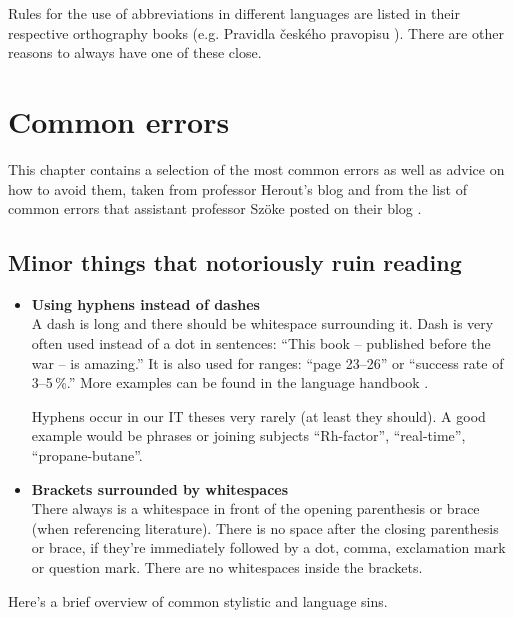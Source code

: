 Rules for the use of abbreviations in different languages are listed in their respective orthography books (e.g. Pravidla českého pravopisu \cite{Pravidla}). There are other reasons to always have one of these close.

\section{Common errors}
\label{chyby}

This chapter contains a selection of the most common errors as well as advice on how to avoid them, taken from professor Herout's blog \cite{Herout} and from the list of common errors that assistant professor Szöke posted on their blog \cite{chyby}.

\subsection*{Minor things that notoriously ruin reading}

\begin{itemize}
	\item{
		\textbf{Using hyphens instead of dashes} \\
		A dash is long and there should be whitespace surrounding it. Dash is very often used instead of a dot in sentences: ``This book -- published before the war -- is amazing.'' It is also used for ranges: 	``page 23--26'' or ``success rate of 3--5\,\%.'' More examples can be found in the language handbook \cite{prirucka}.

Hyphens occur in our IT theses very rarely (at least they should). A good example would be phrases or joining subjects ``Rh-factor'', ``real-time'', ``propane-butane''.
	}
    \item{
    	\textbf{Brackets surrounded by whitespaces} \\
        There always is a whitespace in front of the opening parenthesis or brace (when referencing literature). There is no space after the closing parenthesis or brace, if they're immediately followed by a dot, comma, exclamation mark or question mark. There are no whitespaces inside the brackets.
    }
\end{itemize}

\noindent Here's a brief overview of common stylistic and language sins.

